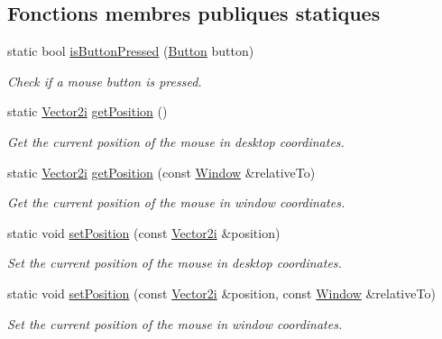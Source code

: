 \subsection*{Fonctions membres publiques statiques}
\begin{DoxyCompactItemize}
\item 
static bool \hyperlink{classsf_1_1Mouse_ab647159eb88e369a0332a9c5a7ba6687}{is\+Button\+Pressed} (\hyperlink{classsf_1_1Mouse_a4fb128be433f9aafe66bc0c605daaa90}{Button} button)
\begin{DoxyCompactList}\small\item\em Check if a mouse button is pressed. \end{DoxyCompactList}\item 
static \hyperlink{classsf_1_1Vector2}{Vector2i} \hyperlink{classsf_1_1Mouse_ac368680f797b7f6e4f50b5b7928c1387}{get\+Position} ()
\begin{DoxyCompactList}\small\item\em Get the current position of the mouse in desktop coordinates. \end{DoxyCompactList}\item 
static \hyperlink{classsf_1_1Vector2}{Vector2i} \hyperlink{classsf_1_1Mouse_a93b4d2ebef728e77a0ec9d83c1e0b0c8}{get\+Position} (const \hyperlink{classsf_1_1Window}{Window} \&relative\+To)
\begin{DoxyCompactList}\small\item\em Get the current position of the mouse in window coordinates. \end{DoxyCompactList}\item 
static void \hyperlink{classsf_1_1Mouse_a1222e16c583be9e3d176d86e0b7817d7}{set\+Position} (const \hyperlink{classsf_1_1Vector2}{Vector2i} \&position)
\begin{DoxyCompactList}\small\item\em Set the current position of the mouse in desktop coordinates. \end{DoxyCompactList}\item 
static void \hyperlink{classsf_1_1Mouse_ad9b16ec7041531315f06b26b413dfea8}{set\+Position} (const \hyperlink{classsf_1_1Vector2}{Vector2i} \&position, const \hyperlink{classsf_1_1Window}{Window} \&relative\+To)
\begin{DoxyCompactList}\small\item\em Set the current position of the mouse in window coordinates. \end{DoxyCompactList}\end{DoxyCompactItemize}


